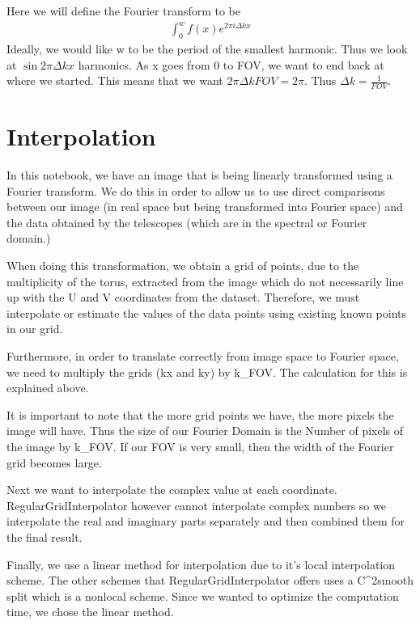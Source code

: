 \documentclass[letterpaper,10pt,english]{jupyterBook}
\begin{document}
\sphinxAtStartPar
Here we will define the Fourier transform to be
\begin{equation*}
\begin{split}\int_0^wf(x)e^{2\pi i \Delta k x}\end{split}
\end{equation*}
\sphinxAtStartPar
Ideally, we would like w to be the period of the smallest harmonic. Thus we look at \(\sin 2\pi \Delta k x\) harmonics. As x goes from 0 to FOV, we want to end back at where we started. This means that we want \( 2\pi \Delta k FOV = 2\pi\). Thus \(\Delta k = \frac{1}{FOV}\).


\section{Interpolation}
\label{\detokenize{interpolation:interpolation}}
\sphinxAtStartPar
In this notebook, we have an image that is being linearly transformed using a Fourier transform. We do this in order to allow us to use direct comparisons between our image (in real space but being transformed into Fourier space) and the data obtained by the telescopes (which are in the spectral or Fourier domain.)

\sphinxAtStartPar
When doing this transformation, we obtain a grid of points, due to the multiplicity of the torus, extracted from the image which do not necessarily line up with the U and V coordinates from the dataset. Therefore, we must interpolate or estimate the values of the data points using existing known points in our grid.

\sphinxAtStartPar
Furthermore, in order to translate correctly from image space to Fourier space, we need to multiply the grids (kx and ky) by k\_FOV. The calculation for this is explained above.

\sphinxAtStartPar
It is important to note that the more grid points we have, the more pixels the image will have. Thus the size of our Fourier Domain is the Number of pixels of the image by k\_FOV. If our FOV is very small, then the width of the Fourier grid becomes large.

\sphinxAtStartPar
Next we want to interpolate the complex value at each coordinate. RegularGridInterpolator however cannot interpolate complex numbers so we interpolate the real and imaginary parts separately and then combined them for the final result.

\sphinxAtStartPar
Finally, we use a linear method for interpolation due to it’s local interpolation scheme. The other schemes that RegularGridInterpolator offers uses a C\textasciicircum{}2\sphinxhyphen{}smooth split which is a non\sphinxhyphen{}local scheme. Since we wanted to optimize the computation time, we chose the linear method.
\end{document}
